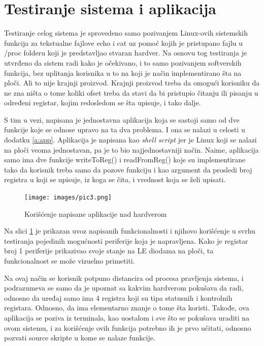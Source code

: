 \documentclass[a4paper, 12pt, diplomski]{etf}
\begin{document}
	\section{Testiranje sistema i aplikacija}

	Testiranje celog sistema je sprovedeno samo pozivanjem Linux-ovih sistemskih funkcija za tekstualne fajlove echo i cat uz pomoć kojih je pristupano fajlu u /proc folderu koji je predstavljao stvaran hardver. Na osnovu tog testiranja je utvrđeno da sistem radi kako je očekivano, i to samo pozivanjem softverskih funkcija, bez uplitanja korisnika u to na koji je način implementirano šta na ploči. Ali to nije krajnji proizvod. Krajnji proizvod treba da omogući korisniku da ne zna ništa o tome koliki ofset treba da stavi da bi pristupio čitanju ili pisanju u određeni registar, kojim redosledom se šta upisuje, i tako dalje.

	S tim u vezi, napisana je jednostavna aplikacija koja se sastoji samo od dve funkcije koje se odnose upravo na ta dva problema. I ona se nalazi u celosti u dodatku \ref{a:app}. Aplikacija je napisana kao \textit{shell script} jer je Linux koji se nalazi na ploči veoma jednostavan, pa je to bio najjednostavniji način. Naime, aplikacija samo ima dve funkcije writeToReg() i readFromReg() koje su implementirane tako da korisnik treba samo da pozove funkciju i kao argument da prosledi broj registra u koji se upisuje, iz koga se čita, i vrednost koja se želi upisati.

	\begin{figure}[h!]
		\centering
		\texttt{[image: images/pic3.png]}
		\caption{Korišćenje napisane aplikacije nad hardverom}
		\label{fig:test}
	\end{figure}

	Na slici \ref{fig:test} je prikazan uvoz napisanih funkcionalnosti i njihovo korišćenje u svrhu testiranja pojedinih mogućnosti periferije koja je napravljena. Kako je registar broj 1 periferije prikazivao svoje stanje na LE diodama na ploči, ta funkcionalnost se može vizuelno primetiti.

	Na ovaj način se korisnik potpuno distancira od procesa pravljenja sistema, i podrazumeva se samo da je upoznat sa kakvim hardverom pokušava da radi, odnosno da uređaj samo ima 4 registra koji su tipa statusnih i kontrolnih registara. Odnosno, da ima elementarno znanje o tome šta koristi. Takođe, ova aplikacija se poziva iz terminala, kao uostalom i sve što se pokušava uraditi na ovom sistemu, i za korišćenje ovih funkcija potrebno ih je prvo učitati, odnosno pozvati source skripte u kome se nalaze funkcije.
\end{document}
